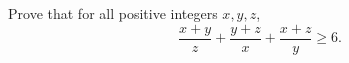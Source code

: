 Prove that for all positive integers $x,y,z$,
\[
\dfrac{x+y}{z}+\dfrac{y+z}{x}+\dfrac{x+z}{y}\ge6 .
\]
